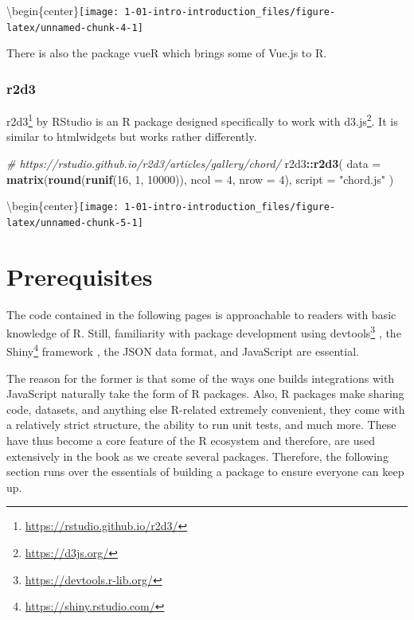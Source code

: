 \documentclass[
]{krantz}
\makeatletter
\newenvironment{Shaded}{\begin{snugshade}}{\end{snugshade}}
\newcommand{\CommentTok}[1]{\textcolor[rgb]{0.37,0.37,0.37}{\textit{#1}}}
\newcommand{\DataTypeTok}[1]{\textcolor[rgb]{0.27,0.27,0.27}{#1}}
\newcommand{\DecValTok}[1]{\textcolor[rgb]{0.06,0.06,0.06}{#1}}
\newcommand{\KeywordTok}[1]{\textcolor[rgb]{0.27,0.27,0.27}{\textbf{#1}}}
\newcommand{\NormalTok}[1]{#1}
\newcommand{\OperatorTok}[1]{\textcolor[rgb]{0.43,0.43,0.43}{\textbf{#1}}}
\newcommand{\StringTok}[1]{\textcolor[rgb]{0.5,0.5,0.5}{#1}}
\renewcommand{\href}[2]{#2\footnote{\url{#1}}}
\newenvironment{kframe}{%
\medskip{}
\setlength{\fboxsep}{.8em}
 \def\at@end@of@kframe{}%
 \ifinner\ifhmode%
  \def\at@end@of@kframe{\end{minipage}}%
  \begin{minipage}{\columnwidth}%
 \fi\fi%
 \def\FrameCommand##1{\hskip\@totalleftmargin \hskip-\fboxsep
 \colorbox{shadecolor}{##1}\hskip-\fboxsep
     \hskip-\linewidth \hskip-\@totalleftmargin \hskip\columnwidth}%
 \MakeFramed {\advance\hsize-\width
   \@totalleftmargin\z@ \linewidth\hsize
   \@setminipage}}%
 {\par\unskip\endMakeFramed%
 \at@end@of@kframe}
\renewenvironment{Shaded}{\begin{kframe}}{\end{kframe}}
\makeatother
\begin{document}
\textbackslash begin\{center\}\texttt{[image: 1-01-intro-introduction\_files/figure-latex/unnamed-chunk-4-1]}

There is also the package vueR \citep{R-vueR} which brings some of Vue.js to R.

\hypertarget{intro-r2d3}{%
\subsection{r2d3}\label{intro-r2d3}}

\href{https://rstudio.github.io/r2d3/}{r2d3} \citep{R-r2d3} by RStudio is an R package designed specifically to work with \href{https://d3js.org/}{d3.js}. It is similar to htmlwidgets but works rather differently.

\begin{Shaded}
\begin{Highlighting}[]
\CommentTok{\# https://rstudio.github.io/r2d3/articles/gallery/chord/}
\NormalTok{r2d3}\OperatorTok{::}\KeywordTok{r2d3}\NormalTok{(}
  \DataTypeTok{data =} \KeywordTok{matrix}\NormalTok{(}\KeywordTok{round}\NormalTok{(}\KeywordTok{runif}\NormalTok{(}\DecValTok{16}\NormalTok{, }\DecValTok{1}\NormalTok{, }\DecValTok{10000}\NormalTok{)), }\DataTypeTok{ncol =} \DecValTok{4}\NormalTok{, }\DataTypeTok{nrow =} \DecValTok{4}\NormalTok{), }
  \DataTypeTok{script =} \StringTok{"chord.js"}
\NormalTok{)}
\end{Highlighting}
\end{Shaded}

\textbackslash begin\{center\}\texttt{[image: 1-01-intro-introduction\_files/figure-latex/unnamed-chunk-5-1]}

\hypertarget{prerequisites}{%
\chapter{Prerequisites}\label{prerequisites}}

The code contained in the following pages is approachable to readers with basic knowledge of R. Still, familiarity with package development using \href{https://devtools.r-lib.org/}{devtools} \citep{R-devtools}, the \href{https://shiny.rstudio.com/}{Shiny} framework \citep{R-shiny}, the JSON data format, and JavaScript are essential.

The reason for the former is that some of the ways one builds integrations with JavaScript naturally take the form of R packages. Also, R packages make sharing code, datasets, and anything else R-related extremely convenient, they come with a relatively strict structure, the ability to run unit tests, and much more. These have thus become a core feature of the R ecosystem and therefore, are used extensively in the book as we create several packages. Therefore, the following section runs over the essentials of building a package to ensure everyone can keep up.
\end{document}
